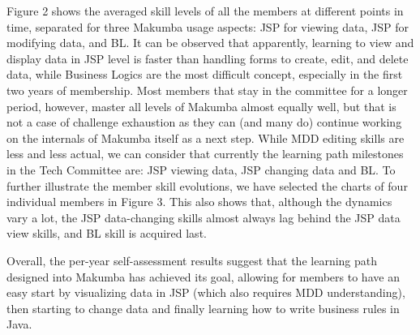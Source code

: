 \documentclass{sig-alt-release2}
\begin{document}
Figure 2 shows the averaged skill levels of all the members at different points in time, separated for three Makumba usage aspects: JSP for viewing data, JSP for modifying data, and BL. It can be observed that apparently, learning to view and display data in JSP level is faster than handling forms to create, edit, and delete data, while Business Logics are the most difficult concept, especially in the first two years of membership. Most members that stay in the committee for a longer period, however, master all levels of Makumba almost equally well, but that is not a case of challenge exhaustion as they can (and many do) continue working on the internals of Makumba itself  as a next step. While MDD editing skills are less and less actual, we can consider that currently the learning path milestones in the Tech Committee are: JSP viewing data, JSP changing data and BL. To further illustrate the member skill evolutions, we have selected the charts of four individual members in Figure 3. This also shows that, although the dynamics vary a lot, the JSP data-changing skills almost always lag behind the JSP data view skills, and BL skill is acquired last. 

Overall, the per-year self-assessment results suggest that the learning path designed into Makumba has achieved its goal, allowing for members to have an easy start by visualizing data in JSP (which also requires MDD understanding), then starting to change data and finally learning how to write business rules in Java.

\end{document}
